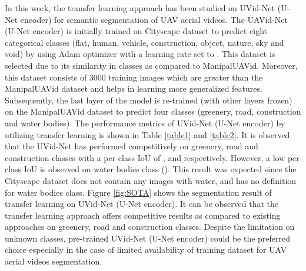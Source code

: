 \documentclass[journal]{IEEEtran}
\begin{document}
\par In this work, the transfer learning approach has been studied on UVid-Net (U-Net encoder) for semantic segmentation of UAV aerial videos. The UAVid-Net (U-Net encoder) is initially trained on Cityscape \cite{cordts2016cityscapes} dataset to predict eight categorical classes (flat, human, vehicle, construction, object, nature, sky and void) by using Adam optimizer with a learning rate set to . This dataset is selected due to its similarity in classes as compared to ManipalUAVid. Moreover, this dataset consists of 3000 training images which are greater than the ManipalUAVid dataset and helps in learning more generalized features. Subsequently, the last layer of the model is re-trained (with other layers frozen) on the ManipalUAVid dataset to predict four classes (greenery, road, construction and water bodies).  The performance metrics of UVid-Net (U-Net encoder) by utilizing transfer learning is shown in Table \ref{table1} and \ref{table2}. It is observed that the UVid-Net has performed competitively on greenery, road and construction classes with a per class IoU of ,  and  respectively. However, a low per class IoU is observed on water bodies class (). This result was expected since the Cityscape dataset does not contain any images with water, and has no definition for water bodies class.  Figure \ref{fig:SOTA} shows the segmentation result of transfer learning on UVid-Net (U-Net encoder). It can be observed that the transfer learning approach offers competitive results as compared to existing approaches on greenery, road and construction classes.  Despite the limitation on unknown classes, pre-trained UVid-Net (U-Net encoder) could be the preferred choice especially in the case of limited availability of training dataset for UAV aerial videos segmentation.
\end{document}
